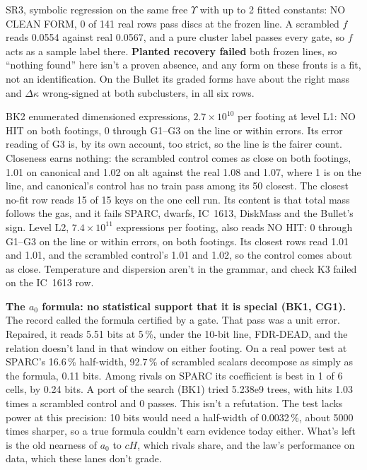 \documentclass[10pt]{article}
\begin{document}
SR3, symbolic regression on the same free $\Upsilon$ with up to 2 fitted constants: NO CLEAN FORM, 0 of 141 real rows pass discs at the frozen line. A scrambled $f$ reads 0.0554 against real 0.0567, and a pure cluster label passes every gate, so $f$ acts as a sample label there. \textbf{Planted recovery failed} both frozen lines, so ``nothing found'' here isn't a proven absence, and any form on these fronts is a fit, not an identification. On the Bullet its graded forms have about the right mass and $\Delta\kappa$ wrong-signed at both subclusters, in all six rows.

BK2 enumerated dimensioned expressions, $2.7\times10^{10}$ per footing at level L1: NO HIT on both footings, 0 through G1--G3 on the line or within errors. Its error reading of G3 is, by its own account, too strict, so the line is the fairer count. Closeness earns nothing: the scrambled control comes as close on both footings, 1.01 on canonical and 1.02 on alt against the real 1.08 and 1.07, where 1 is on the line, and canonical's control has no train pass among its 50 closest. The closest no-fit row reads 15 of 15 keys on the one cell run. Its content is that total mass follows the gas, and it fails SPARC, dwarfs, IC~1613, DiskMass and the Bullet's sign. Level L2, $7.4\times10^{11}$ expressions per footing, also reads NO HIT: 0 through G1--G3 on the line or within errors, on both footings. Its closest rows read 1.01 and 1.01, and the scrambled control's 1.01 and 1.02, so the control comes about as close. Temperature and dispersion aren't in the grammar, and check K3 failed on the IC~1613 row.

\textbf{The $a_0$ formula: no statistical support that it is special (BK1, CG1).} The record called the formula certified by a gate. That pass was a unit error. Repaired, it reads 5.51 bits at 5\,\%, under the 10-bit line, FDR-DEAD, and the relation doesn't land in that window on either footing. On a real power test at SPARC's 16.6\,\% half-width, 92.7\,\% of scrambled scalars decompose as simply as the formula, 0.11 bits. Among rivals on SPARC its coefficient is best in 1 of 6 cells, by 0.24 bits. A port of the search (BK1) tried 5.238e9 trees, with hits 1.03 times a scrambled control and 0 passes. This isn't a refutation. The test lacks power at this precision: 10 bits would need a half-width of 0.0032\,\%, about 5000 times sharper, so a true formula couldn't earn evidence today either. What's left is the old nearness of $a_0$ to $cH$, which rivals share, and the law's performance on data, which these lanes don't grade.
\end{document}

